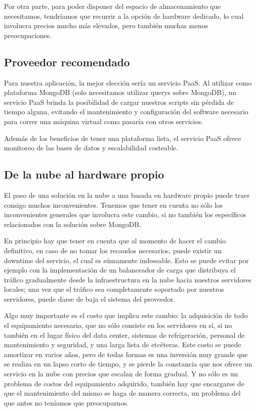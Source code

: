 \documentclass[a4paper,10pt,twoside]{article}
\begin{document}
Por otra parte, para poder disponer del espacio de almacenamiento que necesitamos, tendríamos que recurrir a la opción de hardware dedicado, lo cual involucra precios mucho más elevados, pero también muchas menos preocupaciones.


\subsection{Proveedor recomendado}

Para nuestra aplicación, la mejor elección sería un servicio PaaS. Al utilizar como plataforma MongoDB (solo necesitamos utilizar querys sobre MongoDB), un servicio PaaS brinda la posibilidad de cargar nuestros scripts sin pérdida de tiempo alguna, evitando el mantenimiento y configuración del software necesario para correr una máquina virtual como pasaría con otros servicios.

Además de los beneficios de tener una plataforma lista, el servicio PaaS ofrece monitoreo de las bases de datos y escalabilidad costeable.


\subsection{De la nube al hardware propio}

El paso de una solución en la nube a una basada en hardware propio puede traer consigo muchos inconvenientes. Tenemos que tener en cuenta no sólo los inconvenientes generales que involucra este cambio, si no también los específicos relacionados con la solución sobre MongoDB.

En principio hay que tener en cuenta que al momento de hacer el cambio definitivo, en caso de no tomar los recaudos necesarios, puede existir un downtime del servicio, el cual es súmamente indeseable. Esto se puede evitar por ejemplo con la implementación de un balanceador de carga que distribuya el tráfico gradualmente desde la infraestructura en la nube hacia nuestros servidores locales; una vez que el tráfico sea completamente soportado por nuestros servidores, puede darse de baja el sistema del proveedor.

Algo muy importante es el costo que implica este cambio: la adquisición de todo el equipamiento necesario, que no sólo consiste en los servidores en sí, si no también en el lugar físico del data center, sistemas de refrigeración, personal de mantenimiento y seguridad, y una larga lista de etcéteras. Este costo se puede amortizar en varios años, pero de todas formas es una inversión muy grande que se realiza en un lapso corto de tiempo, y se pierde la constancia que nos ofrece un servicio en la nube con precios que escalan de forma gradual. Y no sólo es un problema de costos del equipamiento adquirido, también hay que encargarse de que el mantenimiento del mismo se haga de manera correcta, un problema del que antes no teníamos que preocuparnos.
\end{document}
